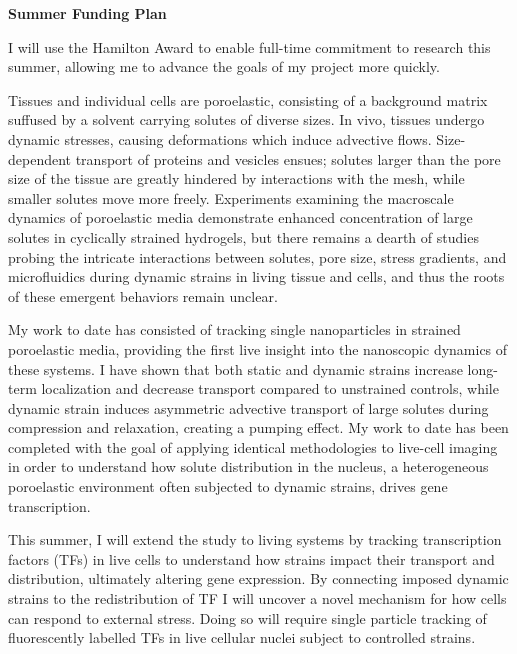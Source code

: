 \newpage
\textbf{Summer Funding Plan}\par

\begin{indented}
I will use the Hamilton Award to enable full-time commitment to research this summer, allowing me to advance the goals of my project more quickly. \par 


Tissues and individual cells are poroelastic, consisting of a background matrix suffused by a solvent carrying solutes of diverse sizes. In vivo, tissues undergo dynamic stresses, causing deformations which induce advective flows. Size-dependent transport of proteins and vesicles ensues; solutes larger than the pore size of the tissue are greatly hindered by interactions with the mesh, while smaller solutes move more freely. Experiments examining the macroscale dynamics of poroelastic media demonstrate enhanced concentration of large solutes in cyclically strained hydrogels, but there remains a dearth of studies probing the intricate interactions between solutes, pore size, stress gradients, and microfluidics during dynamic strains in living tissue and cells, and thus the roots of these emergent behaviors remain unclear.\par

My work to date has consisted of tracking single nanoparticles in strained poroelastic media, providing the first live insight into the nanoscopic dynamics of these systems. I have shown that both static and dynamic strains increase long-term localization and decrease transport compared to unstrained controls, while dynamic strain induces asymmetric advective transport of large solutes during compression and relaxation, creating a pumping effect. My work to date has been completed with the goal of applying identical methodologies to live-cell imaging in order to understand how solute distribution in the nucleus, a heterogeneous poroelastic environment often subjected to dynamic strains, drives gene transcription.\par

This summer, I will extend the study to living systems by tracking transcription factors (TFs) in live cells to understand how strains impact their transport and distribution, ultimately altering gene expression. By connecting imposed dynamic strains to the redistribution of TF I will uncover a novel mechanism for how cells can respond to external stress. Doing so will require single particle tracking of fluorescently labelled TFs in live cellular nuclei subject to controlled strains.\par


\end{indented}
